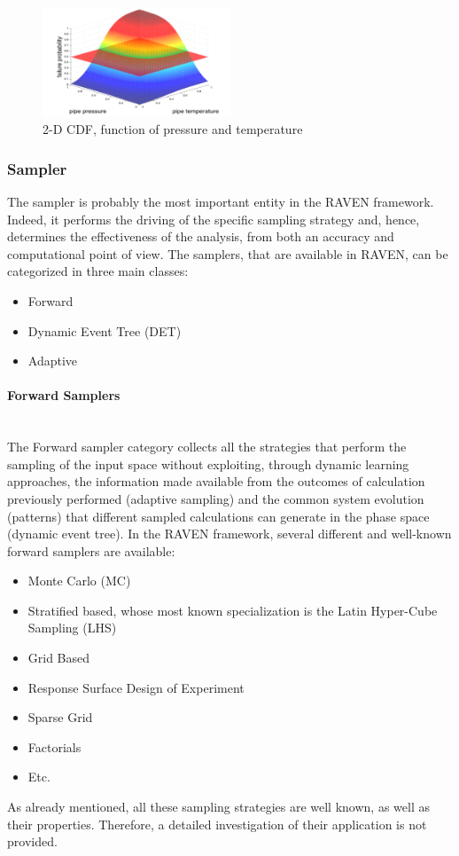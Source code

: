 \begin{figure}
  \centering
  \includegraphics[width=0.5\textwidth]  {pics/NDimensionalDistributionExample.png}
  \caption{2-D CDF, function of pressure and temperature}
  \label{fig:NDDistributionExample}
\end{figure}

\subsubsection{Sampler}

The sampler is probably the most important entity in the RAVEN framework. Indeed, it performs the driving of the specific sampling strategy and, hence, determines the effectiveness of the analysis, from both an accuracy and computational point of view.  The samplers, that are available in RAVEN, can be categorized in three main classes:
\begin{itemize}
 \item Forward
 \item Dynamic Event Tree (DET)
 \item Adaptive
\end{itemize}
\paragraph{Forward Samplers} ~\\
The Forward sampler category collects all the strategies that perform the sampling of the input space without exploiting, through dynamic learning approaches, the information made available from the outcomes of calculation previously performed (adaptive sampling) and the common system evolution (patterns) that different sampled calculations can generate in the phase space (dynamic event tree).
In the RAVEN framework, several different and well-known forward samplers are available:
\begin{itemize}
\item Monte Carlo (MC)
\item Stratified based, whose most known specialization is the Latin Hyper-Cube Sampling (LHS)
\item Grid Based
\item Response Surface Design of Experiment
\item Sparse Grid
\item Factorials
\item Etc.
\end{itemize}
As already mentioned, all these sampling strategies are well known, as well as their properties. Therefore, a detailed investigation of their application is not provided.
